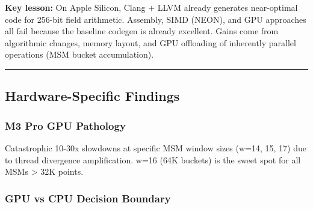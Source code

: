 \documentclass[
]{article}
\begin{document}
\textbf{Key lesson:} On Apple Silicon, Clang + LLVM already generates
near-optimal code for 256-bit field arithmetic. Assembly, SIMD (NEON),
and GPU approaches all fail because the baseline codegen is already
excellent. Gains come from algorithmic changes, memory layout, and GPU
offloading of inherently parallel operations (MSM bucket accumulation).

\begin{center}\rule{0.5\linewidth}{0.5pt}\end{center}

\subsection{Hardware-Specific
Findings}\label{hardware-specific-findings}

\subsubsection{M3 Pro GPU Pathology}\label{m3-pro-gpu-pathology}

Catastrophic 10-30x slowdowns at specific MSM window sizes (w=14, 15,
17) due to thread divergence amplification. w=16 (64K buckets) is the
sweet spot for all MSMs \textgreater{} 32K points.

\subsubsection{GPU vs CPU Decision
Boundary}\label{gpu-vs-cpu-decision-boundary}
\end{document}
